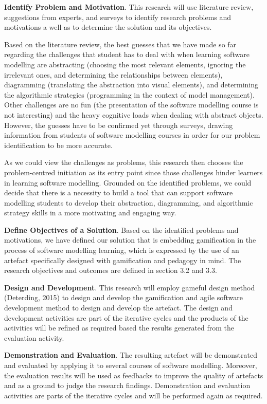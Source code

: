 \documentclass[12pt, a4paper]{report}
\begin{document}
\textbf{Identify Problem and Motivation}. This research will use literature review, suggestions from experts, and surveys to identify research problems and motivations a well as to determine the solution and its objectives.

Based on the literature review, the best guesses that we have made so far regarding the challenges that student has to deal with when learning software modelling are abstracting (choosing the most relevant elements, ignoring the irrelevant ones, and determining the relationships between elements), diagramming (translating the abstraction into visual elements), and determining the algorithmic strategies (programming in the context of model management). Other challenges are no fun (the presentation of the software modelling course is not interesting) and the heavy cognitive loads when dealing with abstract objects. However, the guesses have to be confirmed yet through surveys, drawing information from students of software modelling courses in order for our problem identification to be more accurate.

As we could view the challenges as problems, this research then chooses the problem-centred initiation as its entry point since those challenges hinder learners in learning software modelling.  Grounded on the identified problems, we could decide that there is a necessity to build a tool that can support software modelling students to develop their abstraction, diagramming, and algorithmic strategy skills in a more motivating and engaging way. 

\textbf{Define Objectives of a Solution}. Based on the identified problems and motivations, we have defined our solution that is embedding gamification in the process of software modelling learning, which is expressed by the use of an artefact specifically designed with gamification and pedagogy in mind. The research objectives and outcomes are defined in section 3.2 and 3.3.

\textbf{Design and Development}. This research will employ gameful design method (Deterding, 2015) to design and develop the gamification and agile software development method to design and develop the artefact. The design and development activities are part of the iterative cycles and the products of the activities will be refined as required based the results generated from the evaluation activity.

\textbf{Demonstration and Evaluation}. The resulting artefact will be demonstrated and evaluated by applying it to several courses of software modelling. Moreover, the evaluation results will be used as feedbacks to improve the quality of artefacts and as a ground to judge the research findings.  Demonstration and evaluation activities are parts of the iterative cycles and will be performed again as required. 
\end{document}
